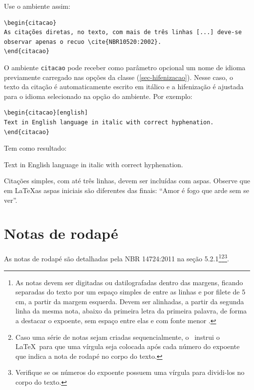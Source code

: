 Use o ambiente assim:

\begin{verbatim}
\begin{citacao}
As citações diretas, no texto, com mais de três linhas [...] deve-se
observar apenas o recuo \cite{NBR10520:2002}.
\end{citacao}
\end{verbatim}

O ambiente \texttt{citacao} pode receber como parâmetro opcional um nome de
idioma previamente carregado nas opções da classe (\autoref{sec-hifenizacao}). Nesse
caso, o texto da citação é automaticamente escrito em itálico e a hifenização é
ajustada para o idioma selecionado na opção do ambiente. Por exemplo:

\begin{verbatim}
\begin{citacao}[english]
Text in English language in italic with correct hyphenation.
\end{citacao}
\end{verbatim}

Tem como resultado:

\begin{citacao}[english]
Text in English language in italic with correct hyphenation.
\end{citacao}

Citações simples, com até três linhas, devem ser
incluídas com aspas. Observe que em \LaTeX as aspas iniciais são diferentes das
finais: ``Amor é fogo que arde sem se ver''.

\section{Notas de rodapé}

As notas de rodapé são detalhadas pela NBR 14724:2011 na seção 5.2.1\footnote{As
notas devem ser digitadas ou datilografadas dentro das margens, ficando
separadas do texto por um espaço simples de entre as linhas e por filete de 5
cm, a partir da margem esquerda. Devem ser alinhadas, a partir da segunda linha
da mesma nota, abaixo da primeira letra da primeira palavra, de forma a destacar
o expoente, sem espaço entre elas e com fonte menor
\textcite{NBR14724:2011}.}\footnote{Caso uma série de notas sejam
criadas sequencialmente, o \abnTeX\ instrui o \LaTeX\ para que uma vírgula seja
colocada após cada número do expoente que indica a nota de rodapé no corpo do
texto.}\footnote{Verifique se os números do expoente possuem uma vírgula para
dividi-los no corpo do texto.}. 


